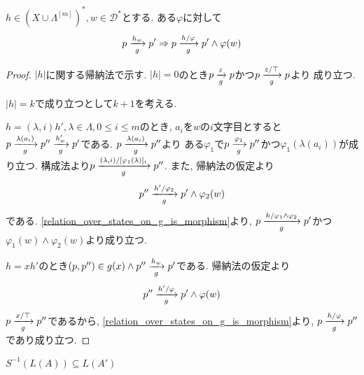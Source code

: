 \documentclass[uplatex,dvipdfmx,a4j]{jsreport}
\begin{document}
  \begin{lemma} \label{outputfunction_is_derivable}
    $h \in (X \cup \Lambda^{[m]})^*, w \in \mathcal{D}^*$とする.
    ある$\varphi$に対して
    \[
      p \transarrow{h_w}{g} p' \Rightarrow p \transarrow{h / \varphi}{g} p' \land \varphi(w)
    \]
  \end{lemma}

  \begin{proof}
    $|h|$に関する帰納法で示す.
    $|h| = 0$のとき$p \transarrow{\varepsilon}{g} p$かつ$p \transarrow{\varepsilon / \top}{g} p$より
    成り立つ.

    $|h| = k$で成り立つとして$k + 1$を考える.

    $h = (\lambda, i) h', \lambda \in \Lambda, 0 \leq i \le m$のとき,
    $a_i$を$w$の$i$文字目とすると
    $p \transarrow{\lambda(a_i)}{g} p'' \transarrow{h'_w}{g} p'$である.
    $p \transarrow{\lambda(a_i)}{g} p''$より
    ある$\varphi_1$で$p \transarrow{\varphi_1}{g} p''$かつ$\varphi_1(\lambda(a_i))$が成り立つ.
    構成法より$p \transarrow{(\lambda, i) / [\varphi_1(\lambda)]_i}{g} p''$.
    また, 帰納法の仮定より
    \[
      p'' \transarrow{h' / \varphi_2}{g} p' \land \varphi_2(w)
    \]
    である.
    \ref{relation_over_states_on_g_is_morphism}より,
    $p \transarrow{h / \varphi_1 \land \varphi_2}{g} p'$かつ
    $\varphi_1(w) \land \varphi_2(w)$より成り立つ.

    $h = x h'$のとき$(p, p'') \in g(x) \land p'' \transarrow{h_w}{g} p'$である.
    帰納法の仮定より
    \[
      p'' \transarrow{h' / \varphi}{g} p' \land \varphi(w)
    \]
    $p \transarrow{x / \top}{g} p''$であるから,
    \ref{relation_over_states_on_g_is_morphism}より,
    $p \transarrow{h / \varphi}{g} p''$であり成り立つ.
  \end{proof}

  \begin{theorem} \label{symbolic_completeness}
    $S^{-1}(L(A)) \subseteq L(A')$
  \end{theorem}
\end{document}
